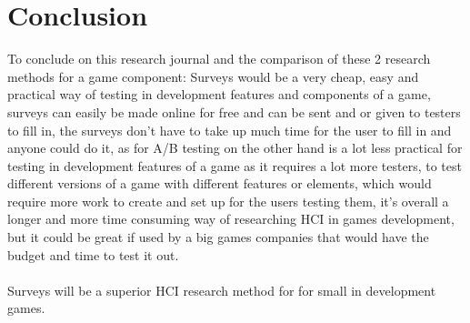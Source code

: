 \documentclass{scrartcl}
\begin{document}
\section{Conclusion}
To conclude on this research journal and the comparison of these 2 research methods for a game component: Surveys would be a very cheap, easy and practical way of testing in development features and components of a game, surveys can easily be made online for free and can be sent and or given to testers to fill in, the surveys don't have to take up much time for the user to fill in and anyone could do it, as for A/B testing on the other hand is a lot less practical for testing in development features of a game as it requires a lot more testers, to test different versions of a game with different features or elements, which would require more work to create and set up for the users testing them, it's overall a longer and more time consuming way of researching HCI in games development, but it could be great if used by a big games companies that would have the budget and time to test it out.
\\
\\
Surveys will be a superior HCI research method for for small in development games.



\end{document}
